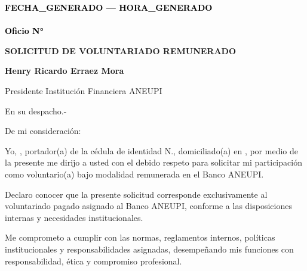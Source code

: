 \documentclass[a4paper,12pt]{article}
\begin{document}
\pagestyle{empty}

\vspace*{-5.5cm}
\begin{flushright}
{\footnotesize \textcolor{black}{\textbf{{{FECHA_GENERADO}} --- {{{HORA_GENERADO}}}}}} \\[-10pt] %
{\footnotesize \textcolor{black}{\underline{\hspace{7.5cm}}}} \\[-2pt] %
{\footnotesize \textcolor{black}{\textbf{Oficio N° }}} 
\end{flushright}


\vspace{2.5cm}
\noindent
\hspace*{\dimexpr\textwidth+1cm\relax}


\begin{center}
    \textbf{\large SOLICITUD DE VOLUNTARIADO REMUNERADO}
\end{center}

\vspace{0.5cm}

\noindent \textbf{Henry Ricardo Erraez Mora} 

\noindent Presidente Institución Financiera ANEUPI 

\noindent En su despacho.-

\vspace{1cm}

\noindent De mi consideración:

\noindent Yo, \textbf{\underline{\hspace{6cm}}}, portador(a) de la cédula de identidad N.\textbf{\underline{\hspace{4cm}}}, domiciliado(a) en \textbf{\underline{\hspace{8cm}}}, por medio de la presente me dirijo a usted con el debido respeto para solicitar mi participación como voluntario(a) bajo modalidad remunerada en el Banco ANEUPI.

\vspace{0.5cm}

\noindent Declaro conocer que la presente solicitud corresponde exclusivamente al voluntariado pagado asignado al Banco ANEUPI, conforme a las disposiciones internas y necesidades institucionales.

\vspace{0.5cm}

\noindent Me comprometo a cumplir con las normas, reglamentos internos, políticas institucionales y responsabilidades asignadas, desempeñando mis funciones con responsabilidad, ética y compromiso profesional.
\end{document}
